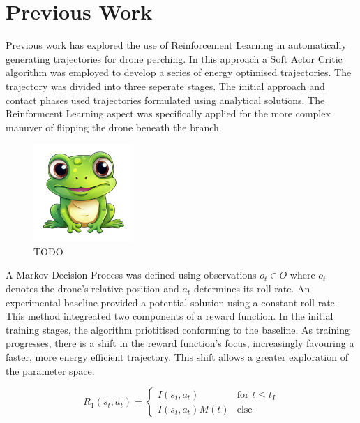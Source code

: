 \section{Previous Work}
\label{sec:background-prev-work}


Previous work has explored the use of Reinforcement Learning in automatically generating trajectories for drone perching\cite{learnedTetheredPerchingFabian}.
In this approach a Soft Actor Critic algorithm was employed to develop a series of energy optimised trajectories.
The trajectory was divided into three seperate stages.
The initial approach and contact phases used trajectories formulated using analytical solutions.
The Reinformcent Learning aspect was specifically applied for the more complex manuver of flipping the drone beneath the branch.

\begin{figure}[htbp]
  \centering
  \includegraphics[width=0.33\textwidth]{frog.png}
  \caption{TODO}
\label{fig:previous-work-manuever-diagram}
\end{figure}

A Markov Decision Process was defined using observations $o_{t} \in O$ where $o_{t}$ denotes the drone's relative position and $a_{t}$ determines its roll rate.
An experimental baseline provided a potential solution using a constant roll rate.
This method integreated two components of a reward function.
In the initial training stages, the algorithm priotitised conforming to the baseline.
As training progresses, there is a shift in the reward function's focus, increasingly favouring a faster, more energy efficient trajectory.
This shift allows a greater exploration of the parameter space.

\[
R_{1}(s_{t}, a_{t}) = 
\begin{cases} 
I(s_{t}, a_{t}) & \text{for } t \leq t_{I} \\
I(s_{t}, a_{t}) M(t) & \text{else} 
\end{cases}
\]

